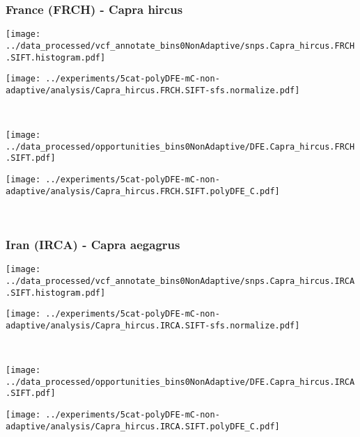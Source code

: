 \subsubsection{France (FRCH) - Capra hircus}

\begin{minipage}{0.49\linewidth}
    \texttt{[image: ../data\_processed/vcf\_annotate\_bins0NonAdaptive/snps.Capra\_hircus.FRCH.SIFT.histogram.pdf]}
\end{minipage}
\begin{minipage}{0.49\linewidth}
    \texttt{[image: ../experiments/5cat-polyDFE-mC-non-adaptive/analysis/Capra\_hircus.FRCH.SIFT-sfs.normalize.pdf]}
\end{minipage}
\\
\begin{minipage}{0.49\linewidth}
    \texttt{[image: ../data\_processed/opportunities\_bins0NonAdaptive/DFE.Capra\_hircus.FRCH.SIFT.pdf]}
\end{minipage}
\begin{minipage}{0.49\linewidth}
    \texttt{[image: ../experiments/5cat-polyDFE-mC-non-adaptive/analysis/Capra\_hircus.FRCH.SIFT.polyDFE\_C.pdf]}
\end{minipage}
\\

\subsubsection{Iran (IRCA) - Capra aegagrus}

\begin{minipage}{0.49\linewidth}
    \texttt{[image: ../data\_processed/vcf\_annotate\_bins0NonAdaptive/snps.Capra\_hircus.IRCA.SIFT.histogram.pdf]}
\end{minipage}
\begin{minipage}{0.49\linewidth}
    \texttt{[image: ../experiments/5cat-polyDFE-mC-non-adaptive/analysis/Capra\_hircus.IRCA.SIFT-sfs.normalize.pdf]}
\end{minipage}
\\
\begin{minipage}{0.49\linewidth}
    \texttt{[image: ../data\_processed/opportunities\_bins0NonAdaptive/DFE.Capra\_hircus.IRCA.SIFT.pdf]}
\end{minipage}
\begin{minipage}{0.49\linewidth}
    \texttt{[image: ../experiments/5cat-polyDFE-mC-non-adaptive/analysis/Capra\_hircus.IRCA.SIFT.polyDFE\_C.pdf]}
\end{minipage}
\\

